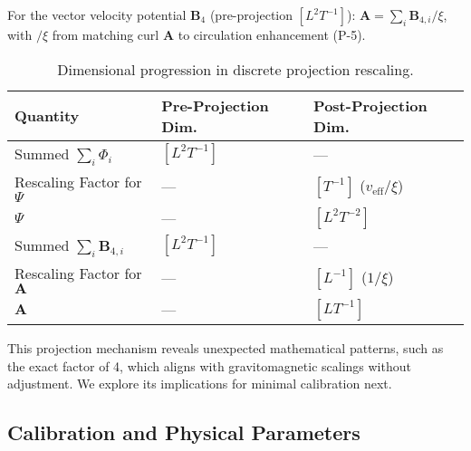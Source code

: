 For the vector velocity potential $\mathbf{B}_4$ (pre-projection $[L^2 T^{-1}]$): $\mathbf{A} = \sum_i \mathbf{B}_{4,i} / \xi$, with $/ \xi$ from matching curl $\mathbf{A}$ to circulation enhancement (P-5).

\begin{table}[H]
\centering
\begin{tabular}{|l|l|l|}
\hline
Quantity & Pre-Projection Dim. & Post-Projection Dim. \\
\hline
Summed $\sum_i \Phi_i$ & $[L^2 T^{-1}]$ & --- \\
Rescaling Factor for $\Psi$ & --- & $[T^{-1}]$ ($v_{\text{eff}} / \xi$) \\
$\Psi$ & --- & $[L^2 T^{-2}]$ \\
Summed $\sum_i \mathbf{B}_{4,i}$ & $[L^2 T^{-1}]$ & --- \\
Rescaling Factor for $\mathbf{A}$ & --- & $[L^{-1}]$ ($1 / \xi$) \\
$\mathbf{A}$ & --- & $[L T^{-1}]$ \\
\hline
\end{tabular}
\caption{Dimensional progression in discrete projection rescaling.}
\label{tab:dim-projection}
\end{table}

\medskip
\noindent
{}
\medskip

This projection mechanism reveals unexpected mathematical patterns, such as the exact factor of 4, which aligns with gravitomagnetic scalings without adjustment. We explore its implications for minimal calibration next.

\subsection{Calibration and Physical Parameters}

